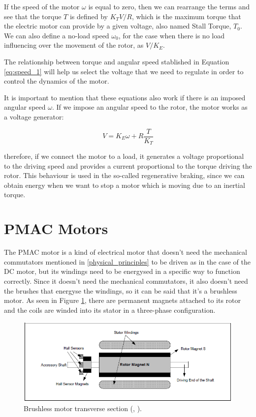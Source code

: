 If the speed of the motor $\omega$ is equal to zero, then we can rearrange the terms and see that the torque $T$ is defined by $K_{T}V/R$, which is the maximum torque that the electric motor can provide by a given voltage, also named Stall Torque, $T_{0}$. We can also define a no-load speed $\omega_{0}$, for the case when there is no load influencing over the movement of the rotor, as $V/K_{E}$.

The relationship between torque and angular speed stablished in Equation \ref{eq:speed_1} will help us select the voltage that we need to regulate in order to control the dynamics of the motor.

It is important to mention that these equations also work if there is an imposed angular speed $\omega$. If we impose an angular speed to the rotor, the motor works as a voltage generator:

\begin{equation} \label{eq:generator_1}
	V = K_{E} \omega + R\frac{T}{K_{T}}
\end{equation}

therefore, if we connect the motor to a load, it generates a voltage proportional to the driving speed and provides a current proportional to the torque driving the rotor. This behaviour is used in the so-called regenerative braking, since we can obtain energy when we want to stop a motor which is moving due to an inertial torque.

\section{PMAC Motors}

The \acf{PMAC} motor is a kind of electrical motor that doesn't need the mechanical commutators mentioned in \ref{physical_principles} to be driven as in the case of the DC motor, but its windings need to be energysed in a specific way to function correctly. Since it doesn't need the mechanical commutators, it also doesn't need the brushes that energyse the windings, so it can be said that it's a brushless motor. As seen in Figure \ref{fig:brushless_section}, there are permanent magnets attached to its rotor and the coils are winded into its stator in a three-phase configuration.

\begin{figure}[htbp]
	\centering
	\includegraphics[width=12cm]{Images/brushless_section.png} 
	\caption[Brushless Motor Transverse Section]{Brushless motor transverse section (\citeauthor{microchip}, \citeyear{microchip}).}
	\label{fig:brushless_section}
\end{figure}

